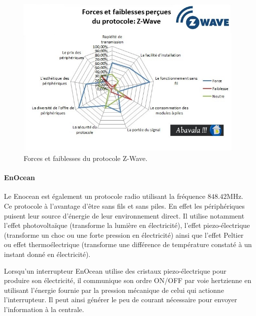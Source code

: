 \documentclass[a4paper,10pt]{article}
\begin{document}
\begin{figure}[H]
\centering\includegraphics[scale=0.7]{images/forces-protocole-zwave.jpg}
\caption{Forces et faiblesses du protocole Z-Wave.}
\end{figure}

\paragraph{EnOcean}
Le Enocean est également un protocole radio utilisant la fréquence $848.42$MHz. Ce protocole à l'avantage d'être sans fils et sans piles. En effet les périphériques puisent leur source d'énergie de leur environnement direct. Il utilise notamment l'effet photovoltaïque (transforme la lumière en électricité), l'effet piezo-électrique (transforme un choc ou une forte pression en électricité) ainsi que l’effet Peltier ou effet thermoélectrique (transforme une différence de température constaté à un instant donné en électricité).

Lorsqu’un interrupteur EnOcean utilise des cristaux piezo-électrique pour produire son électricité, il communique son ordre ON/OFF par voie hertzienne en utilisant l’énergie fournie par la pression mécanique de celui qui actionne l’interrupteur. Il peut ainsi générer le peu de courant nécessaire pour envoyer l’information à la centrale.
\end{document}
